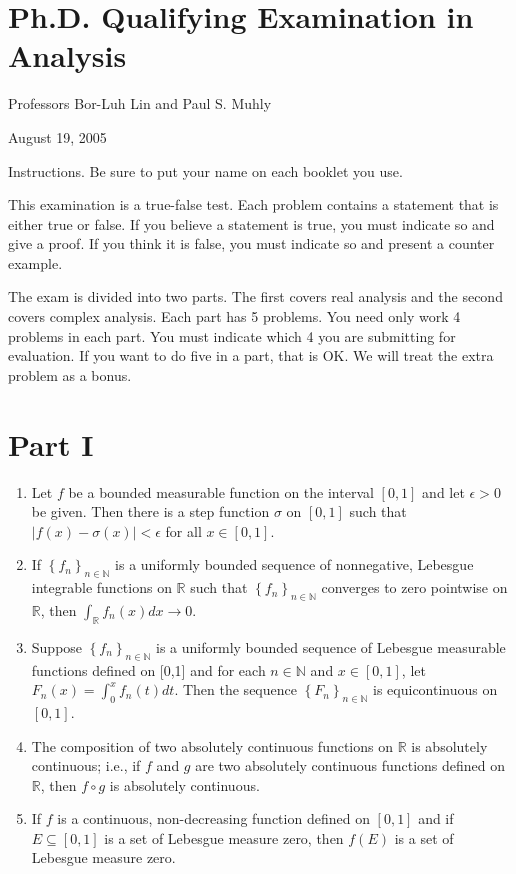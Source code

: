 \documentclass[10pt]{article}
\begin{document}
\section{Ph.D. Qualifying Examination in Analysis}
Professors Bor-Luh Lin and Paul S. Muhly

August 19, 2005

Instructions. Be sure to put your name on each booklet you use.

This examination is a true-false test. Each problem contains a statement that is either true or false. If you believe a statement is true, you must indicate so and give a proof. If you think it is false, you must indicate so and present a counter example.

The exam is divided into two parts. The first covers real analysis and the second covers complex analysis. Each part has 5 problems. You need only work 4 problems in each part. You must indicate which 4 you are submitting for evaluation. If you want to do five in a part, that is OK. We will treat the extra problem as a bonus.

\section{Part I}
\begin{enumerate}
  \item Let $f$ be a bounded measurable function on the interval $[0,1]$ and let $\epsilon>0$ be given. Then there is a step function $\sigma$ on $[0,1]$ such that $|f(x)-\sigma(x)|<\epsilon$ for all $x \in[0,1]$.

  \item If $\left\{f_{n}\right\}_{n \in \mathbb{N}}$ is a uniformly bounded sequence of nonnegative, Lebesgue integrable functions on $\mathbb{R}$ such that $\left\{f_{n}\right\}_{n \in \mathbb{N}}$ converges to zero pointwise on $\mathbb{R}$, then $\int_{\mathbb{R}} f_{n}(x) d x \rightarrow 0$.

  \item Suppose $\left\{f_{n}\right\}_{n \in \mathbb{N}}$ is a uniformly bounded sequence of Lebesgue measurable functions defined on [0,1] and for each $n \in \mathbb{N}$ and $x \in[0,1]$, let $F_{n}(x)=\int_{0}^{x} f_{n}(t) d t$. Then the sequence $\left\{F_{n}\right\}_{n \in \mathbb{N}}$ is equicontinuous on $[0,1]$.

  \item The composition of two absolutely continuous functions on $\mathbb{R}$ is absolutely continuous; i.e., if $f$ and $g$ are two absolutely continuous functions defined on $\mathbb{R}$, then $f \circ g$ is absolutely continuous.

  \item If $f$ is a continuous, non-decreasing function defined on $[0,1]$ and if $E \subseteq[0,1]$ is a set of Lebesgue measure zero, then $f(E)$ is a set of Lebesgue measure zero.

\end{enumerate}
\end{document}
